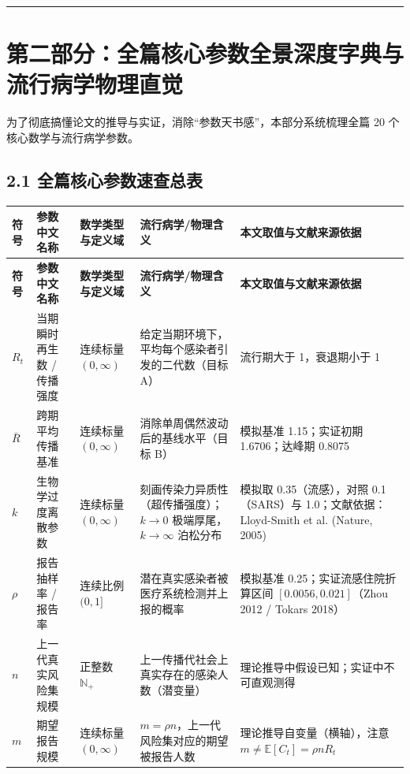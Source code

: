 \documentclass[11pt,a4paper]{ctexart}
\begin{document}
\vspace{0.8em}\hrule\vspace{0.8em}

\section{第二部分：全篇核心参数全景深度字典与流行病学物理直觉}

为了彻底搞懂论文的推导与实证，消除“参数天书感”，本部分系统梳理全篇 20 个核心数学与流行病学参数。


\subsection{2.1 全篇核心参数速查总表}

\begin{center}
\small
\begin{longtable}{lllll}
\toprule
\textbf{符号} & \textbf{参数中文名称} & \textbf{数学类型与定义域} & \textbf{流行病学/物理含义} & \textbf{本文取值与文献来源依据} \\
\midrule
\endfirsthead
\toprule
\textbf{符号} & \textbf{参数中文名称} & \textbf{数学类型与定义域} & \textbf{流行病学/物理含义} & \textbf{本文取值与文献来源依据} \\
\midrule
\endhead
\bottomrule
\endfoot
\textbf{$R_t$} & 当期瞬时再生数 / 传播强度 & 连续标量 $(0, \infty)$ & 给定当期环境下，平均每个感染者引发的二代数（目标 A） & 流行期大于 1，衰退期小于 1 \\
\textbf{$\bar{R}$} & 跨期平均传播基准 & 连续标量 $(0, \infty)$ & 消除单周偶然波动后的基线水平（目标 B） & 模拟基准 1.15；实证初期 1.6706；达峰期 0.8075 \\
\textbf{$k$} & 生物学过度离散参数 & 连续标量 $(0, \infty)$ & 刻画传染力异质性（超传播强度）；$k \to 0$ 极端厚尾，$k \to \infty$ 泊松分布 & 模拟取 0.35（流感），对照 0.1（SARS）与 1.0；文献依据：Lloyd-Smith et al. (Nature, 2005) \\
\textbf{$\rho$} & 报告抽样率 / 报告率 & 连续比例 $(0, 1]$ & 潜在真实感染者被医疗系统检测并上报的概率 & 模拟基准 0.25；实证流感住院折算区间 $[0.0056, 0.021]$（Zhou 2012 / Tokars 2018） \\
\textbf{$n$} & 上一代真实风险集规模 & 正整数 $\mathbb{N}_+$ & 上一传播代社会上真实存在的感染人数（潜变量） & 理论推导中假设已知；实证中不可直观测得 \\
\textbf{$m$} & 期望报告规模 & 连续标量 $(0, \infty)$ & $m = \rho n$，上一代风险集对应的期望被报告人数 & 理论推导自变量（横轴），注意 $m \neq \mathbb{E}[C_t] = \rho n R_t$ \\

\end{longtable}
\end{center}
\end{document}
